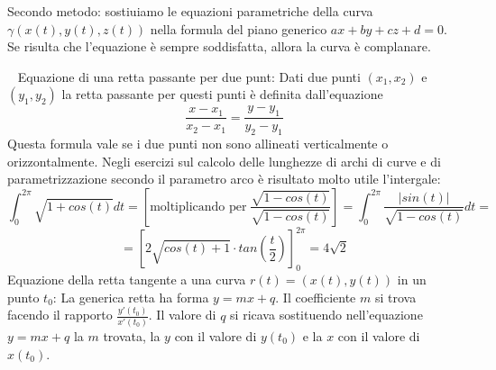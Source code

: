 \begin{tcolorbox}
\begin{itemize}
    Secondo metodo: sostiuiamo le equazioni parametriche della curva $\gamma(x(t), y(t), z(t))$ nella formula del piano generico $ax + by +cz + d = 0$. Se risulta che l'equazione è sempre soddisfatta, allora la curva è complanare.
\end{itemize}
\end{tcolorbox}
\ \newline
Equazione di una retta passante per due punt:\newline
Dati due punti $(x_1, x_2)$ e $(y_1, y_2)$ la retta passante per questi punti è definita dall'equazione
\[
    \frac{x-x_1}{x_2-x_1} = \frac{y-y_1}{y_2-y_1}
\]
Questa formula vale se i due punti non sono allineati verticalmente o orizzontalmente.\newline
\newline
Negli esercizi sul calcolo delle lunghezze di archi di curve e di parametrizzazione secondo il parametro arco è risultato molto utile l'intergale:
\[
    \int_{0}^{2\pi} \sqrt{1 + cos(t)}dt = \left[\text{moltiplicando per} \; \frac{\sqrt{1-cos(t)}}{\sqrt{1-cos(t)}}\right] = \int_{0}^{2\pi}\frac{|sin(t)|}{\sqrt{1-cos(t)}}dt =
\]
\[
    = [2 \sqrt{cos(t) +1}\cdot  tan(\frac{t}{2}) ]_0^{2\pi} = 4 \sqrt{2}
\]
Equazione della retta tangente a una curva $r(t) = (x(t), y(t))$ in un punto $t_0$:\newline
La generica retta ha forma $y = mx +q$. \newline
Il coefficiente $m$ si trova facendo il rapporto $\frac{y'(t_0)}{x'(t_0)}$.\newline
Il valore di $q$ si ricava sostituendo nell'equazione $y = mx +q$ la $m$ trovata, la $y$ con il valore di $y(t_0)$ e la $x$ con il valore di $x(t_0)$.